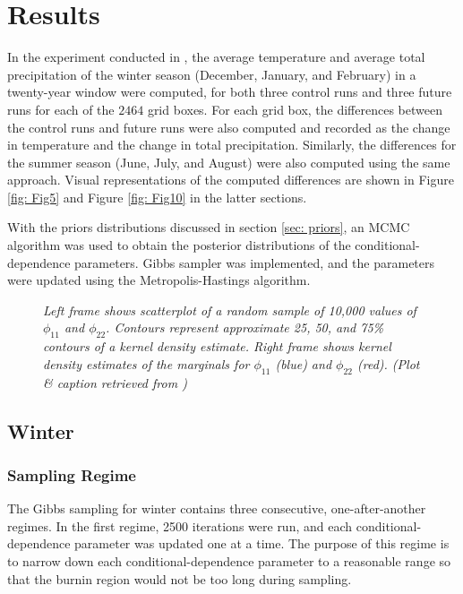 \documentclass{article}
\begin{document}
\section{Results}
In the experiment conducted in \cite{paper}, the average temperature and average total precipitation of the winter season (December, January, and February) in a twenty-year window were computed, for both three control runs and three future runs for each of the $2464$ grid boxes. For each grid box, the differences between the control runs and future runs were also computed and recorded as the change in temperature and the change in total precipitation. Similarly, the differences for the summer season (June, July, and August) were also computed using the same approach. Visual representations of the computed differences are shown in Figure \ref{fig: Fig5} and Figure \ref{fig: Fig10} in the latter sections.

With the priors distributions discussed in section \ref{sec: priors}, an MCMC algorithm was used to obtain the posterior distributions of the conditional-dependence parameters. Gibbs sampler was implemented, and the parameters were updated using the Metropolis-Hastings algorithm. 

\begin{figure}
  \centering
  \caption{\small \emph{Left frame shows scatterplot of a random sample of 10,000 values of $\phi_{11}$ and $\phi_{22}$. Contours represent approximate 25, 50, and 75\% contours of a kernel density estimate. Right frame shows kernel density estimates of the marginals for $\phi_{11}$ (blue) and $\phi_{22}$ (red). (Plot \& caption retrieved from \cite{paper})}}
  \label{fig: Fig3}
\end{figure}

\subsection{Winter}
\subsubsection{Sampling Regime}
\label{sec: regimes}
The Gibbs sampling for winter contains three consecutive, one-after-another regimes. In the first regime, 2500 iterations were run, and each conditional-dependence parameter was updated one at a time. The purpose of this regime is to narrow down each conditional-dependence parameter to a reasonable range so that the burnin region would not be too long during sampling. 
\end{document}
